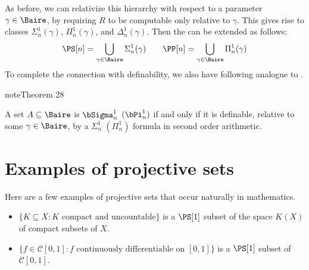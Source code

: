 \documentclass[letterpaper,10pt,english]{jupyterBook}
\begin{document}
\sphinxAtStartPar
As before, we can relativize this hierarchy with respect to a parameter \(\gamma \in \Baire\), by requiring \(R\) to be computable only relative to \(\gamma\). This gives rise to classes \(\Sigma^1_n(\gamma)\), \(\Pi^1_n(\gamma)\), and \(\Delta^1_n(\gamma)\). Then the {\hyperref[\detokenize{codingBorel:thm-fundamental}]{}} can be extended as follows:
\begin{equation*}
\begin{split}
	\PS[n] = \bigcup_{\gamma \in \Baire} \Sigma^1_n(\gamma) \qquad \PP[n] = \bigcup_{\gamma \in \Baire} \Pi^1_n(\gamma)
\end{split}
\end{equation*}
\sphinxAtStartPar
To complete the connection with definability, we also have following analogue to {\hyperref[\detokenize{codingBorel:thm-Borel-arith}]{}}.
\label{projective:thm-projective-definable}
\begin{sphinxadmonition}{note}{Theorem 28}



\sphinxAtStartPar
A set \(A \subseteq \Baire\) is \(\bSigma^1_n\) \((\bPi^1_n)\) if and only if it is definable, relative to some \(\gamma \in \Baire\), by a \(\Sigma^1_n\) \((\Pi^1_n)\) formula in second order arithmetic.
\end{sphinxadmonition}


\section{Examples of projective sets}
\label{\detokenize{projective:examples-of-projective-sets}}
\sphinxAtStartPar
Here are a few examples of projective sets that occur naturally in mathematics.

\sphinxAtStartPar
{}
\begin{itemize}
\item {} 
\sphinxAtStartPar
\(\{K \subseteq X \colon K \text{ compact and uncountable} \} \) is a \(\PS[1]\) subset of the space \(K(X)\) of compact subsets of \(X\).

\item {} 
\sphinxAtStartPar
\(\{f \in \mathcal{C}[0,1]\colon f \text{ continuously differentiable on } [0,1]\}\) is a \(\PS[1]\) subset of \(\mathcal{C}[0,1]\).

\end{itemize}
\end{document}
